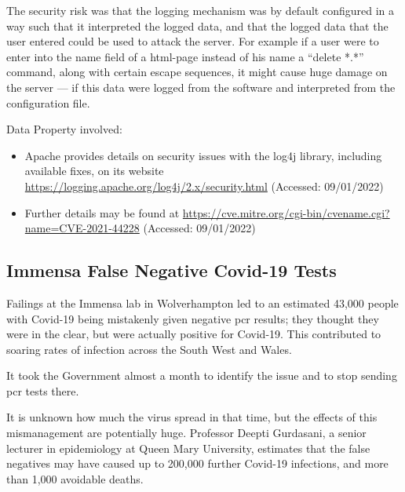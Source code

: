 The security risk was that the logging mechanism was by default configured in a way such that it interpreted the logged data,
and that the logged data that the user entered could be used to attack the server.
For example if a user were to enter into the name field of a html-page instead of his name a ``delete *.*'' command, along with certain escape sequences,
it might cause huge damage on the server --- if this data were logged from the software and interpreted from the configuration file.

Data Property involved: 

\begin{itemize}
  \item Apache provides details on security issues with the log4j library, including available fixes, on its website \href{https://logging.apache.org/log4j/2.x/security.html}{https://logging.apache.org/log4j/2.x/security.html} (Accessed: 09/01/2022)
  \item Further details may be found at \href{https://cve.mitre.org/cgi-bin/cvename.cgi?name=CVE-2021-44228}{https://cve.mitre.org/cgi-bin/cvename.cgi?name=CVE-2021-44228} (Accessed: 09/01/2022)
\end{itemize}

\subsection{Immensa False Negative Covid-19  Tests} \label{bkm:incacc:immensa}
Failings at the Immensa lab in Wolverhampton led to an estimated 43,000 people with Covid-19 being mistakenly given negative \gls{pcr} results;
they thought they were in the clear, but were actually positive for Covid-19.
This contributed to soaring rates of infection across the South West and Wales.

It took the Government almost a month to identify the issue and to stop sending \gls{pcr} tests there.

It is unknown how much the virus spread in that time, but the effects of this mismanagement are potentially huge.
Professor Deepti Gurdasani, a senior lecturer in epidemiology at Queen Mary University,
estimates that the false negatives may have caused up to 200,000 further Covid-19 infections, and more than 1,000 avoidable deaths.

